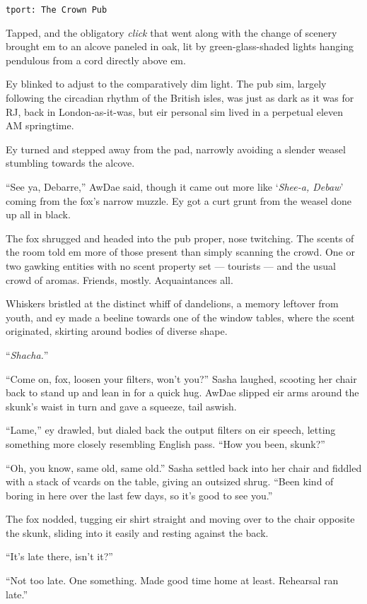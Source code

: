\texttt{tport:\ The\ Crown\ Pub}

Tapped, and the obligatory \emph{click} that went along with the change of scenery brought em to an alcove paneled in oak, lit by green-glass-shaded lights hanging pendulous from a cord directly above em.

Ey blinked to adjust to the comparatively dim light. The pub sim, largely following the circadian rhythm of the British isles, was just as dark as it was for RJ, back in London-as-it-was, but eir personal sim lived in a perpetual eleven AM springtime.

Ey turned and stepped away from the pad, narrowly avoiding a slender weasel stumbling towards the alcove.

``See ya, Debarre,'' AwDae said, though it came out more like `\emph{Shee-a, Debaw}' coming from the fox's narrow muzzle. Ey got a curt grunt from the weasel done up all in black.

The fox shrugged and headed into the pub proper, nose twitching. The scents of the room told em more of those present than simply scanning the crowd. One or two gawking entities with no scent property set — tourists — and the usual crowd of aromas. Friends, mostly. Acquaintances all.

Whiskers bristled at the distinct whiff of dandelions, a memory leftover from youth, and ey made a beeline towards one of the window tables, where the scent originated, skirting around bodies of diverse shape.

``\emph{Shacha.}''

``Come on, fox, loosen your filters, won't you?'' Sasha laughed, scooting her chair back to stand up and lean in for a quick hug. AwDae slipped eir arms around the skunk's waist in turn and gave a squeeze, tail aswish.

``Lame,'' ey drawled, but dialed back the output filters on eir speech, letting something more closely resembling English pass. ``How you been, skunk?''

``Oh, you know, same old, same old.'' Sasha settled back into her chair and fiddled with a stack of vcards on the table, giving an outsized shrug. ``Been kind of boring in here over the last few days, so it's good to see you.''

The fox nodded, tugging eir shirt straight and moving over to the chair opposite the skunk, sliding into it easily and resting against the back.

``It's late there, isn't it?''

``Not too late. One something. Made good time home at least. Rehearsal ran late.''

